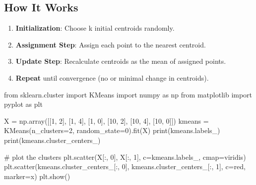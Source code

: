 \documentclass[
  letterpaper,
  DIV=11,
  numbers=noendperiod]{scrreprt}
\newenvironment{Shaded}{\begin{snugshade}}{\end{snugshade}}
\newcommand{\BuiltInTok}[1]{\textcolor[rgb]{0.00,0.23,0.31}{#1}}
\newcommand{\CommentTok}[1]{\textcolor[rgb]{0.37,0.37,0.37}{#1}}
\newcommand{\DecValTok}[1]{\textcolor[rgb]{0.68,0.00,0.00}{#1}}
\newcommand{\ImportTok}[1]{\textcolor[rgb]{0.00,0.46,0.62}{#1}}
\newcommand{\NormalTok}[1]{\textcolor[rgb]{0.00,0.23,0.31}{#1}}
\newcommand{\OperatorTok}[1]{\textcolor[rgb]{0.37,0.37,0.37}{#1}}
\newcommand{\StringTok}[1]{\textcolor[rgb]{0.13,0.47,0.30}{#1}}
\providecommand{\tightlist}{%
  \setlength{\itemsep}{0pt}\setlength{\parskip}{0pt}}\usepackage{longtable,booktabs,array}
\begin{document}
\subsection{How It Works}\label{how-it-works}

\begin{enumerate}
\def\labelenumi{\arabic{enumi}.}
\tightlist
\item
  \textbf{Initialization}: Choose k initial centroids randomly.
\item
  \textbf{Assignment Step}: Assign each point to the nearest centroid.
\item
  \textbf{Update Step}: Recalculate centroids as the mean of assigned
  points.
\item
  \textbf{Repeat} until convergence (no or minimal change in centroids).
\end{enumerate}

\begin{Shaded}
\begin{Highlighting}[]
\ImportTok{from}\NormalTok{ sklearn.cluster }\ImportTok{import}\NormalTok{ KMeans}
\ImportTok{import}\NormalTok{ numpy }\ImportTok{as}\NormalTok{ np}
\ImportTok{from}\NormalTok{ matplotlib }\ImportTok{import}\NormalTok{ pyplot }\ImportTok{as}\NormalTok{ plt}

\NormalTok{X }\OperatorTok{=}\NormalTok{ np.array([[}\DecValTok{1}\NormalTok{, }\DecValTok{2}\NormalTok{], [}\DecValTok{1}\NormalTok{, }\DecValTok{4}\NormalTok{], [}\DecValTok{1}\NormalTok{, }\DecValTok{0}\NormalTok{], [}\DecValTok{10}\NormalTok{, }\DecValTok{2}\NormalTok{], [}\DecValTok{10}\NormalTok{, }\DecValTok{4}\NormalTok{], [}\DecValTok{10}\NormalTok{, }\DecValTok{0}\NormalTok{]])}
\NormalTok{kmeans }\OperatorTok{=}\NormalTok{ KMeans(n\_clusters}\OperatorTok{=}\DecValTok{2}\NormalTok{, random\_state}\OperatorTok{=}\DecValTok{0}\NormalTok{).fit(X)}
\BuiltInTok{print}\NormalTok{(kmeans.labels\_)}
\BuiltInTok{print}\NormalTok{(kmeans.cluster\_centers\_)}

\CommentTok{\# plot the clusters}
\NormalTok{plt.scatter(X[:, }\DecValTok{0}\NormalTok{], X[:, }\DecValTok{1}\NormalTok{], c}\OperatorTok{=}\NormalTok{kmeans.labels\_, cmap}\OperatorTok{=}\StringTok{\textquotesingle{}viridis\textquotesingle{}}\NormalTok{)}
\NormalTok{plt.scatter(kmeans.cluster\_centers\_[:, }\DecValTok{0}\NormalTok{], kmeans.cluster\_centers\_[:, }\DecValTok{1}\NormalTok{], c}\OperatorTok{=}\StringTok{\textquotesingle{}red\textquotesingle{}}\NormalTok{, marker}\OperatorTok{=}\StringTok{\textquotesingle{}x\textquotesingle{}}\NormalTok{)}
\NormalTok{plt.show()}
\end{Highlighting}
\end{Shaded}
\end{document}
